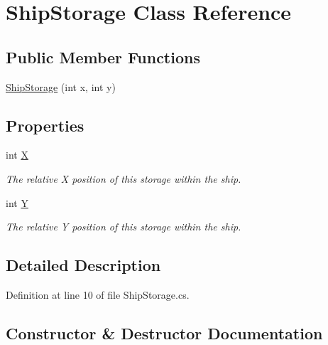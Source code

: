 \hypertarget{class_ship_storage}{}\section{Ship\+Storage Class Reference}
\label{class_ship_storage}
\subsection*{Public Member Functions}
\begin{DoxyCompactItemize}
\item 
\hyperlink{class_ship_storage_a84e74810ca3309eae0fc70530f862bb0}{Ship\+Storage} (int x, int y)
\end{DoxyCompactItemize}
\subsection*{Properties}
\begin{DoxyCompactItemize}
\item 
int \hyperlink{class_ship_storage_ae980dd2d3f9bc510605408a7753e6ec6}{X}
\begin{DoxyCompactList}\small\item\em The relative X position of this storage within the ship. \end{DoxyCompactList}\item 
int \hyperlink{class_ship_storage_ab1cdbe24121b5e9714bbce330c0c11be}{Y}
\begin{DoxyCompactList}\small\item\em The relative Y position of this storage within the ship. \end{DoxyCompactList}\end{DoxyCompactItemize}


\subsection{Detailed Description}


Definition at line 10 of file Ship\+Storage.\+cs.



\subsection{Constructor \& Destructor Documentation}
\mbox{\label{class_ship_storage_a84e74810ca3309eae0fc70530f862bb0}} 
